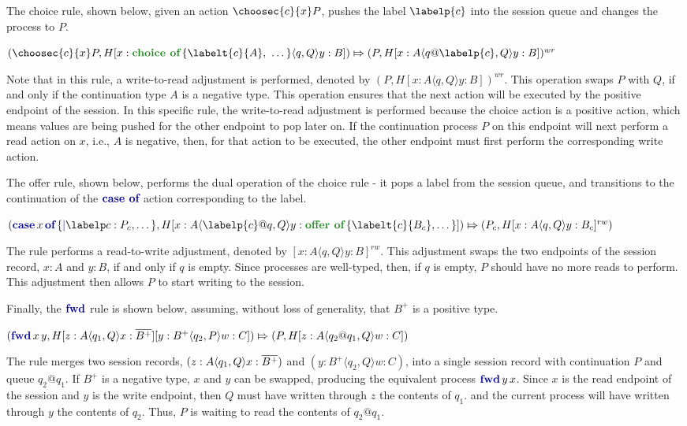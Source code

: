 The choice rule, shown below, given an action $\choosec{c}{x}P$, pushes the label $\labelp{c}$ into the session queue and changes the process to $P$.\vspace{2pt}\\
\vspace{2pt}\centerline{$
    (\choosec{c}{x}P, H[x:\choicet{\labelt{c}{A},\ \dots}\langle q, Q\rangle y:B])
    \Mapsto
    (P,H[x:A\langle q@\labelp{c}, Q\rangle y:B])^{wr}
$}
Note that in this rule, a write-to-read adjustment is performed, denoted by $(P,H[x:A\langle q,Q\rangle y:B])^{wr}$. This operation swaps $P$ with $Q$, if and only if the continuation type $A$ is a negative type. This operation ensures that the next action will be executed by the positive endpoint of the session. In this specific rule, the write-to-read adjustment is performed because the choice action is a positive action, which means values are being pushed for the other endpoint to pop later on. If the continuation process $P$ on this endpoint will next perform a read action on $x$, i.e., $A$ is negative, then, for that action to be executed, the other endpoint must first perform the corresponding write action.

The offer rule, shown below, performs the dual operation of the choice rule - it pops a label from the session queue, and transitions to the continuation of the $\casep$ action corresponding to the label.\vspace{2pt}\\
\vspace{2pt}\centerline{$ 
        (\casec{x}{\labelc{c}{P_c},\dots}, H[x:A\langle \labelp{c}@q, Q\rangle y:\offert{\labelt{c}{B_c},\dots}])
        \Mapsto
        (P_c,H[x:A\langle q, Q\rangle y:B_c]^{rw})
$}
The rule performs a read-to-write adjustment, denoted by $[x:A\langle q, Q\rangle y:B]^{rw}$. This adjustment swaps the two endpoints of the session record, $x:A$ and $y:B$, if and only if $q$ is empty. Since processes are well-typed, then, if $q$ is empty, $P$ should have no more reads to perform. This adjustment then allows $P$ to start writing to the session.

Finally, the $\fwdp$ rule is shown below, assuming, without loss of generality, that $B^+$ is a positive type.\vspace{2pt}\\
\vspace{2pt}\centerline{$
    (\fwdc{x}{y}, H[z:A\langle q_1, Q\rangle x:\dual{B^+}][y:B^+\langle q_2, P\rangle w:C])
    \Mapsto
    (P,H[z:A\langle q_2@q_1, Q\rangle w:C])
$}
The rule merges two session records, $(z:A\langle q_1, Q\rangle x:\overline{B^+})$ and $(y:B^+\langle q_2, Q\rangle w:C)$, into a single session record with continuation $P$ and queue $q_2@q_1$. If $B^+$ is a negative type, $x$ and $y$ can be swapped, producing the equivalent process $\fwdc{y}{x}$. Since $x$ is the read endpoint of the session and $y$ is the write endpoint, then $Q$ must have written through $z$ the contents of $q_1$. and the current process will have written through $y$ the contents of $q_2$. Thus, $P$ is waiting to read the contents of $q_2@q_1$.


